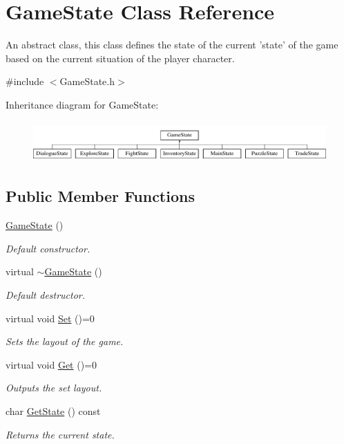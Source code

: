 \hypertarget{classGameState}{\section{Game\-State Class Reference}
\label{classGameState}
}


An abstract class, this class defines the state of the current 'state' of the game based on the current situation of the player character.  




{\ttfamily \#include $<$Game\-State.\-h$>$}

Inheritance diagram for Game\-State\-:\begin{figure}[H]
\begin{center}
\leavevmode
\includegraphics[height=1.584159cm]{classGameState}
\end{center}
\end{figure}
\subsection*{Public Member Functions}
\begin{DoxyCompactItemize}
\item 
\hyperlink{classGameState_a4fa0a2bf50315c4a35a3890a0adcee5c}{Game\-State} ()
\begin{DoxyCompactList}\small\item\em Default constructor. \end{DoxyCompactList}\item 
virtual \hyperlink{classGameState_a517ef6eaba96896259fcefd0c66afc9e}{$\sim$\-Game\-State} ()
\begin{DoxyCompactList}\small\item\em Default destructor. \end{DoxyCompactList}\item 
virtual void \hyperlink{classGameState_af22e9a43999f99b784a35fab85cd9208}{Set} ()=0
\begin{DoxyCompactList}\small\item\em Sets the layout of the game. \end{DoxyCompactList}\item 
virtual void \hyperlink{classGameState_a4283cb3aa5637d4815d64272843a0625}{Get} ()=0
\begin{DoxyCompactList}\small\item\em Outputs the set layout. \end{DoxyCompactList}\item 
char \hyperlink{classGameState_a80d734fcbd886d8a0ce8e3191e770b3a}{Get\-State} () const 
\begin{DoxyCompactList}\small\item\em Returns the current state. \end{DoxyCompactList}\end{DoxyCompactItemize}
